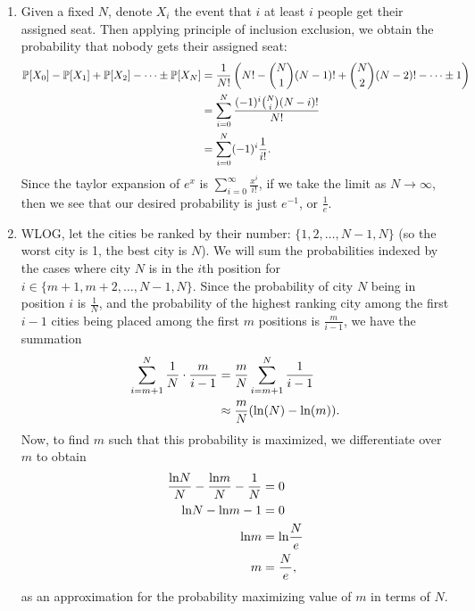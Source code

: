 \begin{enumerate}
    \item Given a fixed $N$, denote $X_i$ the event that $i$ at least $i$ people get their assigned seat. Then applying principle of inclusion exclusion, we obtain the probability that nobody gets their assigned seat:
    \begin{align*}
        \P[X_0] - \P[X_1] + \P[X_2] - \dots \pm \P[X_N] &= \frac{1}{N!}\left(N! - \binom{N}{1}(N - 1)! + \binom{N}{2}(N - 2)! - \dots \pm 1\right) \\
        &= \sum\limits_{i = 0}^N \frac{(-1)^i\binom{N}{i}(N - i)!}{N!} \\
        &= \sum\limits_{i = 0}^N(-1)^i\frac{1}{i!}.
    \end{align*}
    Since the taylor expansion of $e^x$ is $\sum_{i = 0}^\infty \frac{x^i}{i!}$, if we take the limit as $N \to \infty$, then we see that our desired probability is just $e^{-1}$, or $\frac{1}{e}$.
    
    \item WLOG, let the cities be ranked by their number: $\{1, 2, \dots, N - 1, N\}$ (so the worst city is 1, the best city is $N$). We will sum the probabilities indexed by the cases where city $N$ is in the $i$th position for $i \in \{m + 1, m + 2, \dots, N - 1, N\}$. Since the probability of city $N$ being in position $i$ is $\frac{1}{N}$, and the probability of the highest ranking city among the first $i - 1$ cities being placed among the first $m$ positions is $\frac{m}{i - 1}$, we have the summation
    \begin{align*}
        \sum\limits_{i = m + 1}^N \frac{1}{N} \cdot \frac{m}{i - 1} &= \frac{m}{N}\sum\limits_{i = m + 1}^N \frac{1}{i - 1} \\
        &\approx \frac{m}{N}(\f{ln}(N) - \f{ln}(m)).
    \end{align*}
    Now, to find $m$ such that this probability is maximized, we differentiate over $m$ to obtain
    \begin{align*}
        \frac{\f{ln}N}{N} - \frac{\f{ln}m}{N} - \frac{1}{N} &= 0 \\
        \f{ln}N - \f{ln}m - 1 &= 0 \\
        \f{ln}m &= \f{ln}\frac{N}{e} \\
        m &= \frac{N}{e},
    \end{align*}
    as an approximation for the probability maximizing value of $m$ in terms of $N$.
    

\end{enumerate}

